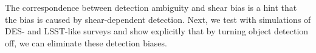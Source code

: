 \documentclass[fleqn,useAMS,usenatbib]{mnras}
\begin{document}
The correspondence between detection ambiguity and shear bias is a hint that
the bias is caused by shear-dependent detection. Next, we test with simulations
of DES- and LSST-like surveys and show explicitly that by turning object
detection off, we can eliminate these detection biases.

%
%
%
%
\end{document}
